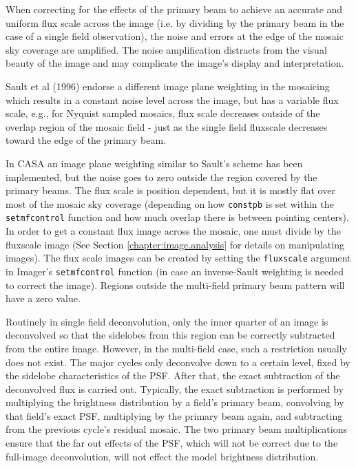\vspace{3mm}

When correcting for the effects of the primary beam to achieve an
accurate and uniform flux scale across the image (i.e.  by dividing by
the primary beam in the case of a single field observation), the noise
and errors at the edge of the mosaic sky coverage are amplified.  The
noise amplification distracts from the visual beauty of the image and
may complicate the image's display and interpretation.

Sault et al (1996) endorse a different image plane weighting in the
mosaicing which results in a constant noise level across the image, but
has a variable flux scale, e.g., for Nyquist sampled mosaics, flux scale
decreases outside of the overlap region of the mosaic field - just as the
single field fluxscale decreases toward the edge of the primary beam.

In CASA an image plane weighting similar to Sault's scheme has been
implemented, but the noise goes to zero outside the region covered by
the primary beams.  The flux scale is position dependent, but it is
mostly flat over most of the mosaic sky coverage (depending on how
{\tt constpb} is set within the {\tt setmfcontrol} function and how
much overlap there is between pointing centers).  In order to get a
constant flux image across the mosaic, one must divide by the
fluxscale image (See Section \ref{chapter:image.analysis} for details
on manipulating images).  The flux scale images can be created by
setting the {\tt fluxscale} argument in Imager's {\tt setmfcontrol}
function (in case an inverse-Sault weighting is needed to correct the
image). Regions outside the multi-field primary beam pattern will have
a zero value.

\vspace{3mm}

Routinely in single field deconvolution, only the inner quarter of an
image is deconvolved so that the sidelobes from this region can be
correctly subtracted from the entire image.  However, in the
multi-field case, such a restriction usually does not exist.  The
major cycles only deconvolve down to a certain level, fixed by the
sidelobe characteristics of the PSF.  After that, the exact
subtraction of the deconvolved flux is carried out.  Typically, the
exact subtraction is performed by multiplying the brightness
distribution by a field's primary beam, convolving by that field's
exact PSF, multiplying by the primary beam again, and subtracting from
the previous cycle's residual mosaic.  The two primary beam
multiplications ensure that the far out effects of the PSF, which will
not be correct due to the full-image deconvolution, will not effect
the model brightness distribution.

